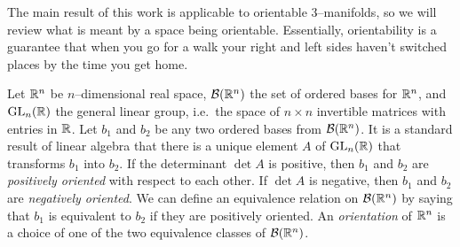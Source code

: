 The main result of this work is applicable to orientable 3--manifolds, so we will review what is meant by a space being orientable.
Essentially, orientability is a guarantee that when you go for a walk your right and left sides haven't switched places by the time you get home.

\begin{defn}[Orientation]
	\label{def:orientation}
	Let $\mathbb{R}^n$ be $n$--dimensional real space, $\mathcal{B}(\mathbb{R}^n)$ the set of ordered bases for $\mathbb{R}^n$, and $\textrm{GL}_{n}(\mathbb{R})$ the general linear group, i.e.\ the space of $n\times n$ invertible matrices with entries in $\mathbb{R}$.
	Let $b_1$ and $b_2$ be any two ordered bases from $\mathcal{B}(\mathbb{R}^n)$.
	It is a standard result of linear algebra that there is a unique element $A$ of $\textrm{GL}_{n}(\mathbb{R})$ that transforms $b_1$ into $b_2$.
	If the determinant $\det A$ is positive, then $b_1$ and $b_2$ are \emph{positively oriented} with respect to each other.
	If $\det A$ is negative, then $b_1$ and $b_2$ are \emph{negatively oriented}.
	We can define an equivalence relation on $\mathcal{B}(\mathbb{R}^n)$ by saying that $b_1$ is equivalent to $b_2$ if they are positively oriented.
	An \emph{orientation} of $\mathbb{R}^n$ is a choice of one of the two equivalence classes of $\mathcal{B}(\mathbb{R}^n)$.
\end{defn}


